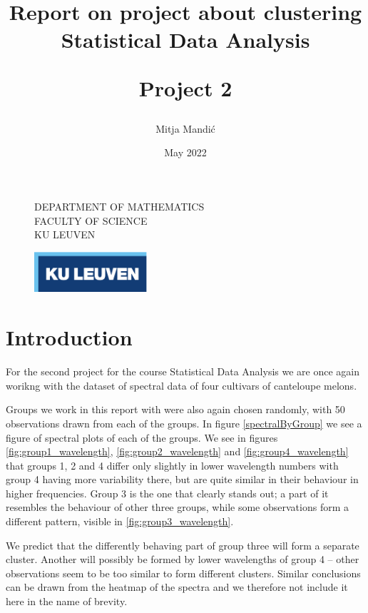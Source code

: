 \documentclass[12pt]{article}
\title{\vspace*{40.0mm}
  \bf Report on project about clustering
         \vspace*{20.0mm} \\
  \Large\bf Statistical Data Analysis 
  
 
  
  Project 2 \vspace*{20.0mm}
  \vspace*{40.0mm}}
\author{Mitja Mandić}
\date{ May 2022}
\makeatletter
\def\cleardoublepage{\clearpage\if@twoside \ifodd\c@page\else%
\hbox{}%
\thispagestyle{empty}%
\clearpage%
\if@twocolumn\hbox{}\clearpage\fi\fi\fi}
\makeatother
\begin{document}
\begin{figure}
  \parbox[t]{125mm}{
    \vspace*{6mm}
    \scriptsize\sf           DEPARTMENT OF MATHEMATICS \\
    \scriptsize\sf           FACULTY OF SCIENCE\\
    \scriptsize\sf           KU LEUVEN}
  \parbox[t]{40mm}{
    \begin{flushright}
      \includegraphics[height=15mm]{../images/logo.eps.pdf}
    \end{flushright}}
\end{figure}

\maketitle
\thispagestyle{empty}
\raggedbottom

\cleardoublepage
{}
\setcounter{tocdepth}{2}
{}

\section{Introduction}
For the second project for the course Statistical Data Analysis we are once again worikng with the
dataset of spectral data of four cultivars of canteloupe melons. 

Groups we work in this report with were also again chosen randomly, with 50 observations drawn from each of the groups. In figure \ref{spectralByGroup} we see a figure of 
spectral plots of each of the groups. We see in figures \ref{fig:group1_wavelength}, \ref{fig:group2_wavelength} and \ref{fig:group4_wavelength}
that groups 1, 2 and 4 differ only slightly in lower wavelength numbers with group 4 having more variability there,
but are quite similar in their behaviour in higher frequencies. Group 3 is the one that clearly stands out; 
a part of it resembles the behaviour of other three groups, while some observations form a different pattern, visible in \ref{fig:group3_wavelength}. 

We predict that the differently behaving part of group three will form a 
separate cluster. Another will possibly be formed by lower wavelengths of group 4 -- other observations seem to be too similar to form different clusters. Similar conclusions can be drawn
from the heatmap of the spectra and we therefore not include it here in the name of brevity.
\end{document}
